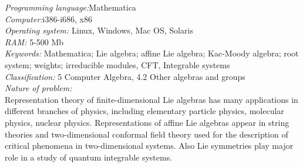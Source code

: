 \documentclass[preprint,12pt]{elsarticle}
\begin{document}
\begin{small}
{\em Programming language:}Mathematica                                   \\
{\em Computer:}i386-i686, x86                                               \\
{\em Operating system:} Linux, Windows, Mac OS, Solaris                                       \\
{\em RAM:} 5-500 Mb                                              \\
{\em Keywords:} Mathematica; Lie algebra; affine Lie algebra; Kac-Moody algebra; root system; weights; irreducible modules, CFT, Integrable systems\\
{\em Classification:} 5 Computer Algebra, 4.2 Other algebras and groups                                         \\
{\em Nature of problem:}\\
Representation theory of finite-dimensional Lie algebras has many applications in different branches of physics, including elementary particle physics, molecular physics, nuclear physics. Representations of affine Lie algebras appear in string theories and two-dimensional conformal field theory used for the description of critical phenomena in two-dimensional systems. Also Lie symmetries play major role in a study of quantum integrable systems.

\end{small}
\end{document}
